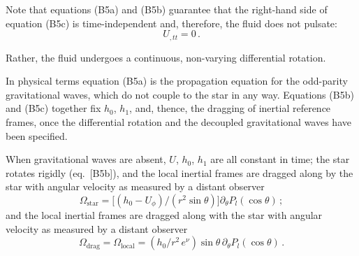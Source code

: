 Note that equations (B5a) and (B5b) guarantee that the right-hand side of equation (B5c) is
time-independent and, therefore, the fluid does not pulsate:
%
\begin{equation}
U_{,tt} = 0 \,.
\tag{B6}
\end{equation}

Rather, the fluid undergoes a continuous, non-varying differential rotation.

In physical terms equation (B5a) is the propagation equation for the odd-parity gravitational
waves, which do not couple to the star in any way. Equations (B5b) and (B5c) together fix $h_0$,
$h_1$, and, thence, the dragging of inertial reference frames, once the differential rotation and the
decoupled gravitational waves have been specified.

When gravitational waves are absent, $U$, $h_0$, $h_1$ are all constant in time; the star rotates
rigidly (eq.~[B5b]), and the local inertial frames are dragged along by the star with angular velocity
as measured by a distant observer
%
\begin{equation}
\Omega_\mathrm{star} = \bigl[(h_0 - U_\phi)/(r^2\sin\theta)\bigr]
    \partial_\theta P_l(\cos\theta) \,;
\tag{B7}
\end{equation}
%
and the local inertial frames are dragged along with the star with angular velocity as measured by
a distant observer
%
\begin{equation}
\Omega_\mathrm{drag} = \Omega_\mathrm{local} =
    (h_0/r^2\,e^\nu)\sin\theta\,\partial_\theta P_l(\cos\theta) \,.
\tag{B8}
\end{equation}
